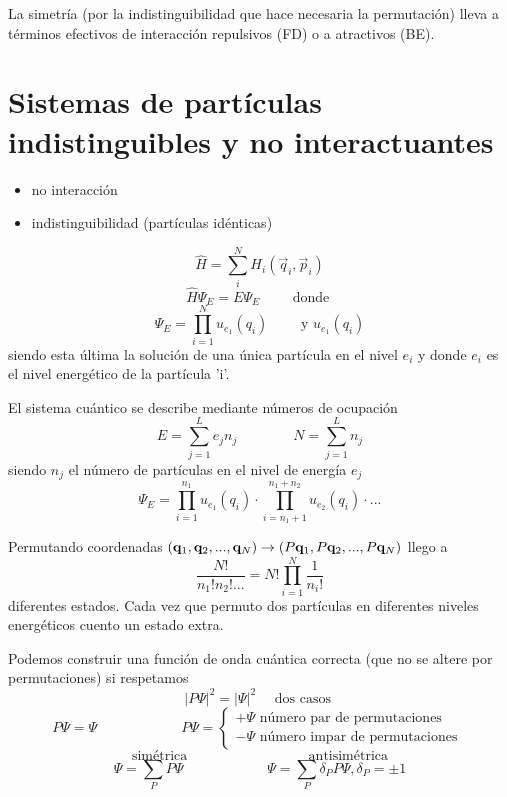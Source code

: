 \documentclass[10pt,oneside]{CBFT_book}
\begin{document}
La simetría (por la indistinguibilidad que hace necesaria la permutación) lleva a términos efectivos de interacción 
repulsivos (FD) o a atractivos (BE).

\section{Sistemas de partículas indistinguibles y no interactuantes}

\begin{itemize}
 \item no interacción
 \item indistinguibilidad (partículas idénticas)
\end{itemize}

\[
	\hat{H} = \sum_i^N H_i (\vec{q}_i , \vec{p}_i )
\]
\[
	\hat{H} \Psi_E = E \Psi_E \qquad \text{ donde }
\]
\[
	\Psi_E = \prod_{i=1}^{N} u_{e_1}(q_i) \qquad \text{ y } u_{e_1}(q_i)
\]
siendo esta última la solución de una única partícula en el nivel $e_i$ 
y donde $e_i$ es el nivel energético de la partícula 'i'.

El sistema cuántico se describe mediante números de ocupación
\[
	E = \sum_{j=1}^L e_j n_j  \qquad \qquad  N = \sum_{j=1}^L  n_j
\]
siendo $n_j$ el número de partículas en el nivel de energía $e_j$ 
\[
	\Psi_E = \prod_{i=1}^{n_1} u_{e_1}(q_i) \cdot \prod_{i = n_1 + 1 }^{ n_1 + n_2 } u_{e_2}(q_i) \cdot ...
\]

Permutando coordenadas $(\vb{q}_1,\vb{q}_2,...,\vb{q}_N ) \to (P\vb{q}_1,P\vb{q}_2,...,P\vb{q}_N)$ llego a
\[
	\frac{N!}{n_1!n_2!...} = N! \prod_{i=1}^N \frac{1}{n_i!}
\]
diferentes estados. Cada vez que permuto dos partículas en diferentes niveles energéticos cuento un estado extra.

Podemos construir una función de onda cuántica correcta (que no se altere por permutaciones) si respetamos
\[
	| P\Psi |^2 = | \Psi |^2 \quad \text{ dos casos }
\]
\[
	P\Psi = \Psi \qquad \qquad \qquad P\Psi = 
	\begin{cases}
	+ \Psi \text{ número par de permutaciones } \\ 
	- \Psi \text{ número impar de permutaciones } 
	\end{cases}
\]
\[
	\text{ simétrica } \qquad \qquad \qquad \qquad \text{ antisimétrica } 
\]
\[
	\Psi = \sum_P P\Psi \qquad \qquad \qquad \Psi = \sum_P \delta_P P\Psi, \delta_P = \pm 1
\]
\end{document}
